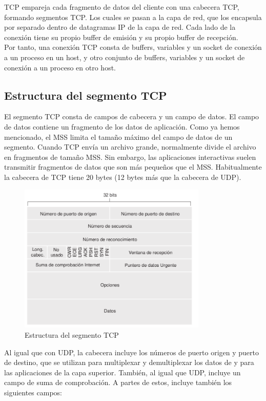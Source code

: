 \documentclass[a4paper,11pt]{article}
\begin{document}
TCP empareja cada fragmento de datos del cliente con una cabecera TCP, formando segmentos TCP. Los cuales se pasan a la capa de red, que los encapsula por separado dentro de datagramas IP de la capa de red. Cada lado de la conexión tiene su propio buffer de emisión y su propio buffer de recepción. \\

Por tanto, una conexión TCP consta de buffers, variables y un socket de conexión a un proceso en un host, y otro conjunto de buffers, variables y un socket de conexión a un proceso en otro host. \\

\subsection{Estructura del segmento TCP}
El segmento TCP consta de campos de cabecera y un campo de datos. El campo de datos contiene un fragmento de los datos de aplicación. Como ya hemos mencionado, el MSS limita el tamaño máximo del campo de datos de un segmento. Cuando TCP envía un archivo grande, normalmente divide el archivo en fragmentos de tamaño MSS. Sin embargo, las aplicaciones interactivas suelen transmitir fragmentos de datos que son más pequeños que el MSS. Habitualmente la cabecera de TCP tiene 20 bytes (12 bytes más que la cabecera de UDP).

\begin{figure}[h]
\centering
\caption{Estructura del segmento TCP}
\includegraphics[scale=1,width=0.8\textwidth]{estructura_tcp.png}
\end{figure} 

Al igual que con UDP, la cabecera incluye los números de puerto origen y puerto de destino, que se utilizan para multiplexar y demultiplexar los datos de y para las aplicaciones de la capa superior. También, al igual que UDP, incluye un campo de suma de comprobación. A partes de estos, incluye también los siguientes campos:
\end{document}
